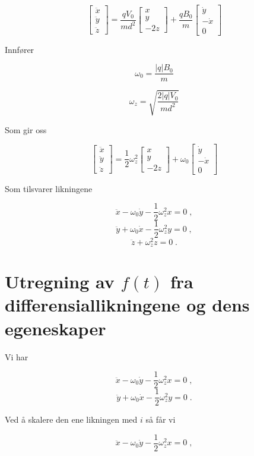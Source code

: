 \documentclass[reprint,english,notitlepage, nofootinbib]{revtex4-1}  %
\begin{document}
$$\begin{bmatrix} \ddot{x} \\ \ddot{y} \\ \ddot{z} \end{bmatrix} = \frac{qV_0}{md^2} \begin{bmatrix}
x \\ y \\ -2z 
\end{bmatrix} + \frac{qB_0}{m} \begin{bmatrix}
\dot{y} \\ -\dot{x} \\ 0
\end{bmatrix}$$ 

Innfører 

$$\omega_0 = \frac{|q|B_0}{m}$$

$$ \omega_z = \sqrt{\frac{2|q|V_0}{md^2}}$$

Som gir oss

$$\begin{bmatrix} \ddot{x} \\ \ddot{y} \\ \ddot{z} \end{bmatrix} = \frac{1}{2}\omega_z^2 \begin{bmatrix}
x \\ y \\ -2z 
\end{bmatrix} + \omega_0 \begin{bmatrix}
\dot{y} \\ -\dot{x} \\ 0
\end{bmatrix}$$ 

Som tilsvarer likningene

$$
\ddot{x} - \omega_0 \dot{y} - \frac{1}{2}\omega_z^2 x = 0 \; ,
$$
$$\ddot{y} + \omega_0 \dot{x} - \frac{1}{2}\omega_z^2 y = 0 \; ,
$$
$$\ddot{z} + \omega_z^2 z = 0 \; .
$$
\section{Utregning av $f(t)$ fra differensiallikningene og dens egeneskaper}\label{utfxy}

Vi har 

$$
\ddot{x} - \omega_0 \dot{y} - \frac{1}{2}\omega_z^2 x = 0 \; ,
$$
$$\ddot{y} + \omega_0 \dot{x} - \frac{1}{2}\omega_z^2 y = 0 \; .
$$

Ved å skalere den ene likningen med $i$ så får vi

$$\ddot{x} - \omega_0 \dot{y} - \frac{1}{2}\omega_z^2 x = 0 \; ,$$
\end{document}
